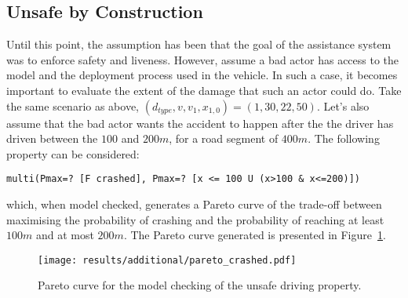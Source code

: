 %
%
%

\subsection{Unsafe by Construction}

Until this point, the assumption has been that the goal of the assistance system was to enforce safety and liveness. However, assume a bad actor has access to the model and the deployment process used in the vehicle. In such a case, it becomes important to evaluate the extent of the damage that such an actor could do. Take the same scenario as above, $(d_{type}, v, v_1, x_{1,0}) = (1, 30, 22, 50)$. Let's also assume that the bad actor wants the accident to happen after the the driver has driven between the $100$ and $200m$, for a road segment of $400m$. The following property can be considered:

\begin{minipage}{\linewidth}
{\vspace{1em}
\begin{lstlisting}
multi(Pmax=? [F crashed], Pmax=? [x <= 100 U (x>100 & x<=200)])
\end{lstlisting}
}
\end{minipage}

which, when model checked, generates a Pareto curve of the trade-off between maximising the probability of crashing and the probability of reaching at least $100m$ and at most $200m$. The Pareto curve generated is presented in Figure~\ref{fig:unsafe_pareto}.

\begin{figure}[H]
\centering
\texttt{[image: results/additional/pareto\_crashed.pdf]}
\caption{Pareto curve for the model checking of the unsafe driving property.}
\label{fig:unsafe_pareto}
\end{figure}

